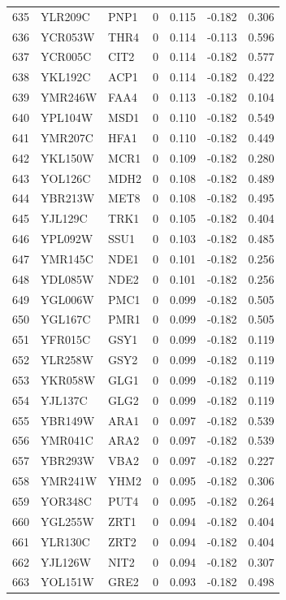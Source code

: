 \begin{longtable}{rllrrrr}
635 & YLR209C & PNP1 & 0 & 0.115 & -0.182 & 0.306\\
636 & YCR053W & THR4 & 0 & 0.114 & -0.113 & 0.596\\
637 & YCR005C & CIT2 & 0 & 0.114 & -0.182 & 0.577\\
638 & YKL192C & ACP1 & 0 & 0.114 & -0.182 & 0.422\\
639 & YMR246W & FAA4 & 0 & 0.113 & -0.182 & 0.104\\
640 & YPL104W & MSD1 & 0 & 0.110 & -0.182 & 0.549\\
641 & YMR207C & HFA1 & 0 & 0.110 & -0.182 & 0.449\\
642 & YKL150W & MCR1 & 0 & 0.109 & -0.182 & 0.280\\
643 & YOL126C & MDH2 & 0 & 0.108 & -0.182 & 0.489\\
644 & YBR213W & MET8 & 0 & 0.108 & -0.182 & 0.495\\
645 & YJL129C & TRK1 & 0 & 0.105 & -0.182 & 0.404\\
646 & YPL092W & SSU1 & 0 & 0.103 & -0.182 & 0.485\\
647 & YMR145C & NDE1 & 0 & 0.101 & -0.182 & 0.256\\
648 & YDL085W & NDE2 & 0 & 0.101 & -0.182 & 0.256\\
649 & YGL006W & PMC1 & 0 & 0.099 & -0.182 & 0.505\\
650 & YGL167C & PMR1 & 0 & 0.099 & -0.182 & 0.505\\
651 & YFR015C & GSY1 & 0 & 0.099 & -0.182 & 0.119\\
652 & YLR258W & GSY2 & 0 & 0.099 & -0.182 & 0.119\\
653 & YKR058W & GLG1 & 0 & 0.099 & -0.182 & 0.119\\
654 & YJL137C & GLG2 & 0 & 0.099 & -0.182 & 0.119\\
655 & YBR149W & ARA1 & 0 & 0.097 & -0.182 & 0.539\\
656 & YMR041C & ARA2 & 0 & 0.097 & -0.182 & 0.539\\
657 & YBR293W & VBA2 & 0 & 0.097 & -0.182 & 0.227\\
658 & YMR241W & YHM2 & 0 & 0.095 & -0.182 & 0.306\\
659 & YOR348C & PUT4 & 0 & 0.095 & -0.182 & 0.264\\
660 & YGL255W & ZRT1 & 0 & 0.094 & -0.182 & 0.404\\
661 & YLR130C & ZRT2 & 0 & 0.094 & -0.182 & 0.404\\
662 & YJL126W & NIT2 & 0 & 0.094 & -0.182 & 0.307\\
663 & YOL151W & GRE2 & 0 & 0.093 & -0.182 & 0.498\\

\end{longtable}
